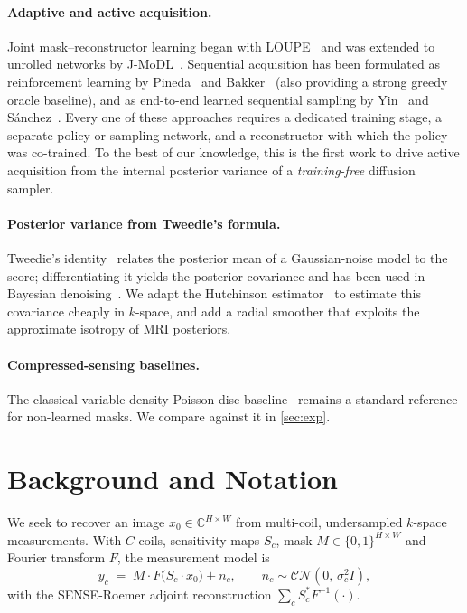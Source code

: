 \documentclass[conference]{IEEEtran}
\newcommand{\xz}{x_0}
\begin{document}
\paragraph{Adaptive and active acquisition.} Joint mask--reconstructor
learning began with LOUPE~\cite{bahadir2020loupe} and was extended to
unrolled networks by J-MoDL~\cite{aggarwal2020jmodl}. Sequential
acquisition has been formulated as reinforcement learning by
Pineda~\cite{pineda2020activerl} and Bakker~\cite{bakker2020experimental}
(also providing a strong greedy oracle baseline), and as end-to-end
learned sequential sampling by Yin~\cite{yin2021endtoend} and
S{\'a}nchez~\cite{sanchez2020sequential}. Every one of these
approaches requires a dedicated training stage, a separate policy or
sampling network, and a reconstructor with which the policy was
co-trained. To the best of our knowledge, this is the first work to
drive active acquisition from the internal posterior variance of a
\emph{training-free} diffusion sampler.

\paragraph{Posterior variance from Tweedie's formula.} Tweedie's
identity~\cite{efron2011tweedie} relates the posterior mean of a
Gaussian-noise model to the score; differentiating it yields the
posterior covariance and has been used in Bayesian
denoising~\cite{kim2021tweedie}. We adapt the Hutchinson
estimator~\cite{hutchinson1990estimation} to estimate this covariance
cheaply in $k$-space, and add a radial smoother that exploits the
approximate isotropy of MRI posteriors.

\paragraph{Compressed-sensing baselines.} The classical
variable-density Poisson disc baseline~\cite{lustig2007sparse} remains
a standard reference for non-learned masks. We compare against it in
\cref{sec:exp}.

\section{Background and Notation}\label{sec:bg}

We seek to recover an image $\xz \in \mathbb{C}^{H \times W}$ from
multi-coil, undersampled $k$-space measurements. With $C$ coils,
sensitivity maps $S_c$, mask $M \in \{0,1\}^{H \times W}$ and Fourier
transform $F$, the measurement model is
\begin{equation}
  y_c \;=\; M \cdot F\bigl(S_c \cdot \xz\bigr) + n_c,\qquad
  n_c \sim \mathcal{CN}\!\left(0,\,\sigma_c^{2} I\right),
  \label{eq:fwd}
\end{equation}
with the SENSE-Roemer adjoint reconstruction
$\sum_c S_c^{*} F^{-1}(\cdot)$.
\end{document}
